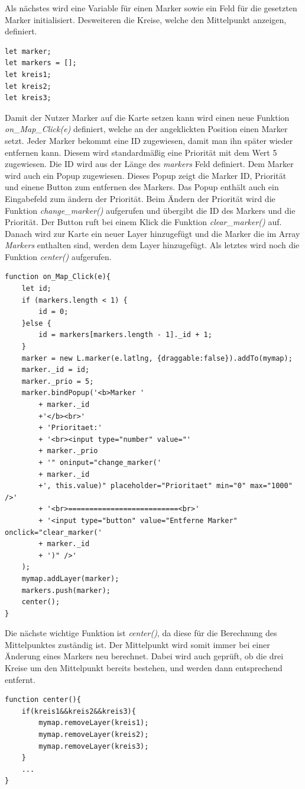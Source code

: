\documentclass[a4paper, 12pt]{scrreprt}
\begin{document}
Als nächstes wird eine Variable für einen Marker sowie ein Feld für die gesetzten Marker initialisiert.
Desweiteren die Kreise, welche den Mittelpunkt anzeigen, definiert.
\begin{lstlisting}
let marker;
let markers = [];
let kreis1;
let kreis2;
let kreis3;
\end{lstlisting}
Damit der Nutzer Marker auf die Karte setzen kann wird einen neue Funktion \textit{on\_Map\_Click(e)} definiert, welche an der angeklickten Position einen Marker setzt.
Jeder Marker bekommt eine ID zugewiesen, damit man ihn später wieder entfernen kann.
Diesem wird standardmäßig eine Priorität mit dem Wert 5 zugewiesen.
Die ID wird aus der Länge des \textit{markers} Feld definiert.
Dem Marker wird auch ein Popup zugewiesen.
Dieses Popup zeigt die Marker ID, Priorität und einene Button zum entfernen des Markers.
Das Popup enthält auch ein Eingabefeld zum ändern der Priorität.
Beim Ändern der Priorität wird die Funktion \textit{change}\_\textit{marker()} aufgerufen und übergibt die ID des Markers und die Priorität.
Der Button ruft bei einem Klick die Funktion \textit{clear}\_\textit{marker()} auf.
Danach wird zur Karte ein neuer Layer hinzugefügt und die Marker die im Array \textit{Markers} enthalten sind, werden dem Layer hinzugefügt.
Als letztes wird noch die Funktion \textit{center()} aufgerufen.
\begin{lstlisting}
function on_Map_Click(e){
	let id;
	if (markers.length < 1) {
		id = 0;
	}else {
		id = markers[markers.length - 1]._id + 1;
	}
	marker = new L.marker(e.latlng, {draggable:false}).addTo(mymap);
	marker._id = id;
	marker._prio = 5;
	marker.bindPopup('<b>Marker '
		+ marker._id
		+'</b><br>'
    	+ 'Prioritaet:'
		+ '<br><input type="number" value="'
		+ marker._prio
		+ '" oninput="change_marker('
		+ marker._id
		+', this.value)" placeholder="Prioritaet" min="0" max="1000" />'
		+ '<br>==========================<br>'
		+ '<input type="button" value="Entferne Marker" onclick="clear_marker('
		+ marker._id
		+ ')" />'
	);
	mymap.addLayer(marker);
	markers.push(marker);
	center();
}
\end{lstlisting}
Die nächste wichtige Funktion ist \textit{center()}, da diese für die Berechnung des Mittelpunktes zuständig ist.
Der Mittelpunkt wird somit immer bei einer Änderung eines Markers neu berechnet.
Dabei wird auch geprüft, ob die drei Kreise um den Mittelpunkt bereits bestehen, und werden dann entsprechend entfernt.
\begin{lstlisting}
function center(){
	if(kreis1&&kreis2&&kreis3){
		mymap.removeLayer(kreis1);
		mymap.removeLayer(kreis2);
		mymap.removeLayer(kreis3);
	}
	...
}
\end{lstlisting}
\end{document}
